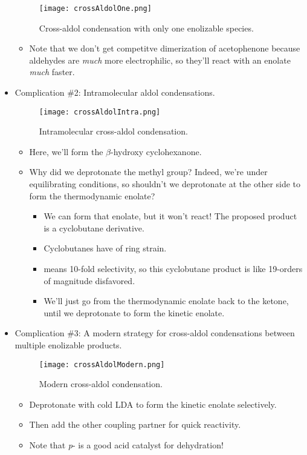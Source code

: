 \documentclass[../notes.tex]{subfiles}
\begin{document}
\begin{itemize}
\begin{figure}[h!]
        \centering
        \texttt{[image: crossAldolOne.png]}
        \caption{Cross-aldol condensation with only one enolizable species.}
        \label{fig:crossAldolOne}
    \end{figure}
    \begin{itemize}
        \item Note that we don't get competitve dimerization of acetophenone because aldehydes are \emph{much} more electrophilic, so they'll react with an enolate \emph{much} faster.
    \end{itemize}
    \pagebreak
    \item Complication \#2: Intramolecular aldol condensations.
    \begin{figure}[h!]
        \centering
        \texttt{[image: crossAldolIntra.png]}
        \caption{Intramolecular cross-aldol condensation.}
        \label{fig:crossAldolIntra}
    \end{figure}
    \begin{itemize}
        \item Here, we'll form the $\beta$-hydroxy cyclohexanone.
        \item Why did we deprotonate the methyl group? Indeed, we're under equilibrating conditions, so shouldn't we deprotonate at the other side to form the thermodynamic enolate?
        \begin{itemize}
            \item We can form that enolate, but it won't react! The proposed product is a cyclobutane derivative.
            \item Cyclobutanes have  of ring strain.
            \item {} means 10-fold selectivity, so this cyclobutane product is like 19-orders of magnitude disfavored.
            \item We'll just go from the thermodynamic enolate back to the ketone, until we deprotonate to form the kinetic enolate.
        \end{itemize}
    \end{itemize}
    \item Complication \#3: A modern strategy for cross-aldol condensations between multiple enolizable products.
    \begin{figure}[h!]
        \centering
        \texttt{[image: crossAldolModern.png]}
        \caption{Modern cross-aldol condensation.}
        \label{fig:crossAldolModern}
    \end{figure}
    \begin{itemize}
        \item Deprotonate with cold LDA to form the kinetic enolate selectively.
        \item Then add the other coupling partner for quick reactivity.
        \item Note that \emph{p}- is a good acid catalyst for dehydration!
    \end{itemize}
\end{itemize}
\end{document}
